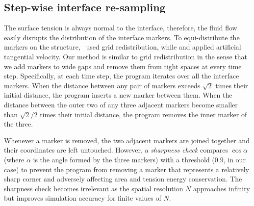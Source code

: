 \documentclass[%
 aip,
 amsmath,amssymb,
 reprint,
 floatfix
]{revtex4-1}
\begin{document}
\subsection{Step-wise interface re-sampling}
The surface tension is always normal to the interface, therefore, the fluid flow easily disrupts the distribution of the interface markers. To equi-distribute the markers on the structure,~\citet{lai2008immersed} used grid redistribution, while \citet{hou1994removing} and \citet{lai2010numerical} applied artificial tangential velocity. Our method is similar to grid redistribution in the sense that we add markers to wide gaps and remove them from tight spaces at every time step. Specifically, at each time step, the program iterates over all the interface markers. When the distance between any pair of markers exceeds $\sqrt{2}$ times their initial distance, the program inserts a new marker between them. When the distance between the outer two of any three adjacent markers become smaller than $\sqrt{2}/2$ times their initial distance, the program removes the inner marker of the three. 

Whenever a marker is removed, the two adjacent markers are joined together and their coordinates are left untouched. However, a \textit{sharpness check} compares $\cos \alpha$ (where $\alpha$ is the angle formed by the three markers) with a threshold ($0.9$, in our case) to prevent the program from removing a marker that represents a relatively sharp corner and adversely affecting area and tension energy conservation. The sharpness check becomes irrelevant as the spatial resolution $N$ approaches infinity but improves simulation accuracy for finite values of $N$. 
\end{document}
